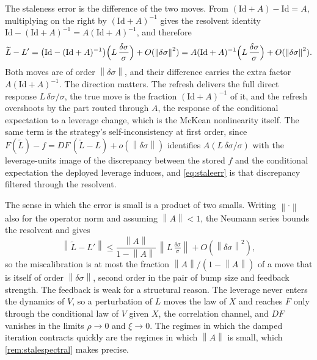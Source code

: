 \documentclass[11pt,a4paper]{article}
\theoremstyle{plain}
\theoremstyle{definition}
\theoremstyle{definition}
\newcommand{\norm}[1]{\left\lVert #1 \right\rVert}
\newcommand{\Lev}{L}
\newcommand{\Id}{\mathrm{Id}}
\begin{document}
The staleness error is the difference of the two moves. From $(\Id+A) - \Id = A$, multiplying on the right by $(\Id+A)^{-1}$ gives the resolvent identity $\Id - (\Id+A)^{-1} = A(\Id+A)^{-1}$, and therefore
\begin{equation}\label{eq:staleerr}
  \widetilde{\Lev} - \Lev'
  = \bigl(\Id - (\Id+A)^{-1}\bigr)\Bigl(\Lev\,\frac{\delta\sigma}{\sigma}\Bigr) + O(\norm{\delta\sigma}^2)
  = A(\Id+A)^{-1}\Bigl(\Lev\,\frac{\delta\sigma}{\sigma}\Bigr) + O(\norm{\delta\sigma}^2) .
\end{equation}
Both moves are of order $\norm{\delta\sigma}$, and their difference carries the extra factor $A(\Id+A)^{-1}$. The direction matters. The refresh delivers the full direct response $\Lev\,\delta\sigma/\sigma$, the true move is the fraction $(\Id+A)^{-1}$ of it, and the refresh overshoots by the part routed through $A$, the response of the conditional expectation to a leverage change, which is the McKean nonlinearity itself. The same term is the strategy's self-inconsistency at first order, since $F(\widetilde{\Lev}) - f = DF\,(\widetilde{\Lev} - \Lev) + o(\norm{\delta\sigma})$ identifies $A(\Lev\,\delta\sigma/\sigma)$ with the leverage-units image of the discrepancy between the stored $f$ and the conditional expectation the deployed leverage induces, and \cref{eq:staleerr} is that discrepancy filtered through the resolvent.

The sense in which the error is small is a product of two smalls. Writing $\norm{\cdot}$ also for the operator norm and assuming $\norm{A} < 1$, the Neumann series bounds the resolvent and gives
\[
  \norm{\widetilde{\Lev} - \Lev'} \leq \frac{\norm{A}}{1 - \norm{A}}\,\norm{\Lev\,\tfrac{\delta\sigma}{\sigma}} + O(\norm{\delta\sigma}^2),
\]
so the miscalibration is at most the fraction $\norm{A}/(1-\norm{A})$ of a move that is itself of order $\norm{\delta\sigma}$, second order in the pair of bump size and feedback strength. The feedback is weak for a structural reason. The leverage never enters the dynamics of $V$, so a perturbation of $\Lev$ moves the law of $X$ and reaches $F$ only through the conditional law of $V$ given $X$, the correlation channel, and $DF$ vanishes in the limits $\rho \to 0$ and $\xi \to 0$. The regimes in which the damped iteration contracts quickly are the regimes in which $\norm{A}$ is small, which \cref{rem:stalespectral} makes precise.
\end{document}

